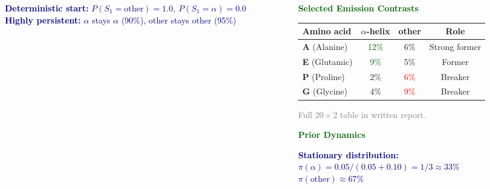 \documentclass[aspectratio=169,10pt]{beamer}
\begin{document}
\begin{frame}[plain]
\begin{minipage}{0.90\textwidth}
\begin{columns}[T,totalwidth=\textwidth]
\begin{column}{0.50\textwidth}
{\fontsize{6.5}{7.5}\selectfont
\textcolor{navy}{
\textbf{Deterministic start:} $P(S_1=\text{other})=1.0,\ P(S_1=\alpha)=0.0$\\[3pt]
\textbf{Highly persistent:} $\alpha$ stays $\alpha$ (90\%), other stays other (95\%)
}}

\end{column}

\begin{column}{0.46\textwidth}

{\fontsize{7.5}{8.5}\selectfont
\textbf{\textcolor{darkgreen}{Selected Emission Contrasts}}
}

\vspace{0.06cm}

{\fontsize{6.5}{7.5}\selectfont
\begin{tabular}{lccc}
\toprule
Amino acid & $\alpha$-helix & other & Role \\
\midrule
\textbf{A} (Alanine)  & \textcolor{darkgreen}{12\%} & 6\%  & Strong former \\
\textbf{E} (Glutamic) & \textcolor{darkgreen}{9\%}  & 5\%  & Former \\
\textbf{P} (Proline)  & 2\%  & \textcolor{red}{6\%}  & Breaker \\
\textbf{G} (Glycine)  & 4\%  & \textcolor{red}{9\%}  & Breaker \\
\bottomrule
\end{tabular}
}

\vspace{0.04cm}

{\fontsize{5.5}{6.5}\selectfont
\textcolor{gray}{Full $20 \times 2$ table in written report.}
}

\vspace{0.16cm}

{\fontsize{7.5}{8.5}\selectfont
\textbf{\textcolor{darkgreen}{Prior Dynamics}}
}

\vspace{0.06cm}

{\fontsize{6.8}{8.0}\selectfont
\textcolor{navy}{
\textbf{Stationary distribution:}\\[2pt]
$\pi(\alpha)=0.05/(0.05+0.10)=1/3\approx 33\%$\\[2pt]
$\pi(\text{other})\approx 67\%$
}}

\vspace{0.06cm}



\end{column}
\end{columns}
\end{minipage}
\end{frame}
\end{document}
